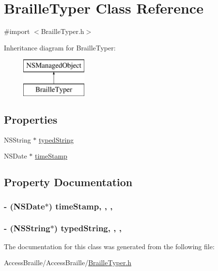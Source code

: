 \hypertarget{interface_braille_typer}{\section{Braille\-Typer Class Reference}
\label{interface_braille_typer}
}


{\ttfamily \#import $<$Braille\-Typer.\-h$>$}

Inheritance diagram for Braille\-Typer\-:\begin{figure}[H]
\begin{center}
\leavevmode
\includegraphics[height=2.000000cm]{interface_braille_typer}
\end{center}
\end{figure}
\subsection*{Properties}
\begin{DoxyCompactItemize}
\item 
N\-S\-String $\ast$ \hyperlink{interface_braille_typer_ab141efe5994e2138c42e50c27695d204}{typed\-String}
\item 
N\-S\-Date $\ast$ \hyperlink{interface_braille_typer_a27ae62fa789cbc7f9b25ff72723cd552}{time\-Stamp}
\end{DoxyCompactItemize}


\subsection{Property Documentation}
\hypertarget{interface_braille_typer_a27ae62fa789cbc7f9b25ff72723cd552}{
\subsubsection[{time\-Stamp}]{\setlength{\rightskip}{0pt plus 5cm}-\/ (N\-S\-Date$\ast$) time\-Stamp\hspace{0.3cm}{\ttfamily [read]}, {\ttfamily [write]}, {\ttfamily [nonatomic]}, {\ttfamily [retain]}}}\label{interface_braille_typer_a27ae62fa789cbc7f9b25ff72723cd552}
\hypertarget{interface_braille_typer_ab141efe5994e2138c42e50c27695d204}{
\subsubsection[{typed\-String}]{\setlength{\rightskip}{0pt plus 5cm}-\/ (N\-S\-String$\ast$) typed\-String\hspace{0.3cm}{\ttfamily [read]}, {\ttfamily [write]}, {\ttfamily [nonatomic]}, {\ttfamily [retain]}}}\label{interface_braille_typer_ab141efe5994e2138c42e50c27695d204}


The documentation for this class was generated from the following file\-:\begin{DoxyCompactItemize}
\item 
Access\-Braille/\-Access\-Braille/\hyperlink{_braille_typer_8h}{Braille\-Typer.\-h}\end{DoxyCompactItemize}
